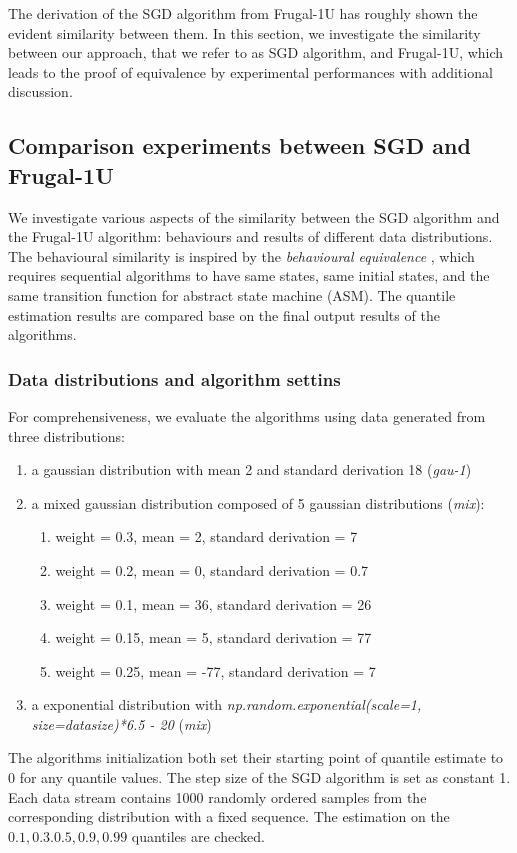 The derivation of the SGD algorithm from Frugal-1U has roughly shown the evident similarity between them. In this section, we investigate the similarity between our approach, that we refer to as SGD algorithm, and Frugal-1U, which leads to the proof of equivalence by experimental performances with additional discussion.

\subsection{Comparison experiments between SGD and Frugal-1U}

We investigate various aspects of the similarity between the SGD algorithm and the Frugal-1U algorithm: behaviours and results of different data distributions. The behavioural similarity is inspired by the \textit{behavioural equivalence} \cite{gurevichSequentialAbstractstateMachines2000}, which requires sequential algorithms to have same states, same initial states, and the same transition function for abstract state machine (ASM). The quantile estimation results are compared base on the final output results of the algorithms.

\subsubsection{Data distributions and algorithm settins}
\label{subsubsec: distro_and_setting}
For comprehensiveness, we evaluate the algorithms using data generated from three distributions:
    \begin{enumerate}
        \item a gaussian distribution with mean 2 and standard derivation 18 (\textit{gau-1})
        \item a mixed gaussian distribution composed of 5 gaussian distributions (\textit{mix}):
            \begin{enumerate}
                \item weight = 0.3, mean = 2, standard derivation = 7
                \item weight = 0.2, mean = 0, standard derivation = 0.7
                \item weight = 0.1, mean = 36, standard derivation = 26
                \item weight = 0.15, mean = 5, standard derivation = 77
                \item weight = 0.25, mean = -77, standard derivation = 7
            \end{enumerate}
            \item a exponential distribution with \textit{np.random.exponential(scale=1, size=datasize)*6.5 - 20} (\textit{mix})
    \end{enumerate}
The algorithms initialization both set their starting point of quantile estimate to $0$ for any quantile values. The step size of the SGD algorithm is set as constant 1. Each data stream contains 1000 randomly ordered samples from the corresponding distribution with a fixed sequence. The estimation on the $0.1, 0.3. 0.5, 0.9, 0.99$ quantiles are checked.

